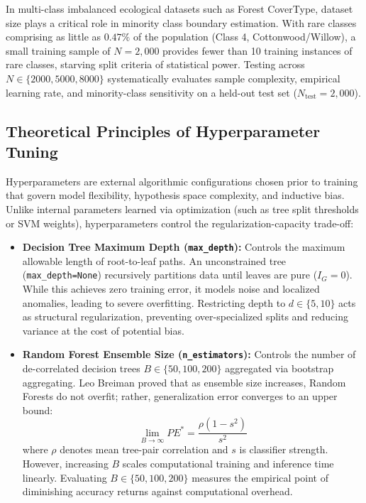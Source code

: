 In multi-class imbalanced ecological datasets such as Forest CoverType, dataset size plays a critical role in minority class boundary estimation. With rare classes comprising as little as $0.47\%$ of the population (Class 4, Cottonwood/Willow), a small training sample of $N=2,000$ provides fewer than 10 training instances of rare classes, starving split criteria of statistical power. Testing across $N \in \{2000, 5000, 8000\}$ systematically evaluates sample complexity, empirical learning rate, and minority-class sensitivity on a held-out test set ($N_{\text{test}} = 2,000$).

\subsection{Theoretical Principles of Hyperparameter Tuning}
\label{sec:theory_hyperparameter}

Hyperparameters are external algorithmic configurations chosen prior to training that govern model flexibility, hypothesis space complexity, and inductive bias. Unlike internal parameters learned via optimization (such as tree split thresholds or SVM weights), hyperparameters control the regularization-capacity trade-off:
\begin{itemize}
    \item \textbf{Decision Tree Maximum Depth (\texttt{max\_depth}):} Controls the maximum allowable length of root-to-leaf paths. An unconstrained tree (\texttt{max\_depth=None}) recursively partitions data until leaves are pure ($I_G = 0$). While this achieves zero training error, it models noise and localized anomalies, leading to severe overfitting. Restricting depth to $d \in \{5, 10\}$ acts as structural regularization, preventing over-specialized splits and reducing variance at the cost of potential bias.
    \item \textbf{Random Forest Ensemble Size (\texttt{n\_estimators}):} Controls the number of de-correlated decision trees $B \in \{50, 100, 200\}$ aggregated via bootstrap aggregating. Leo Breiman proved that as ensemble size increases, Random Forests do not overfit; rather, generalization error converges to an upper bound:
    \begin{equation}
        \lim_{B \to \infty} PE^* = \frac{\rho(1 - s^2)}{s^2}
    \end{equation}
    where $\rho$ denotes mean tree-pair correlation and $s$ is classifier strength. However, increasing $B$ scales computational training and inference time linearly. Evaluating $B \in \{50, 100, 200\}$ measures the empirical point of diminishing accuracy returns against computational overhead.
\end{itemize}

